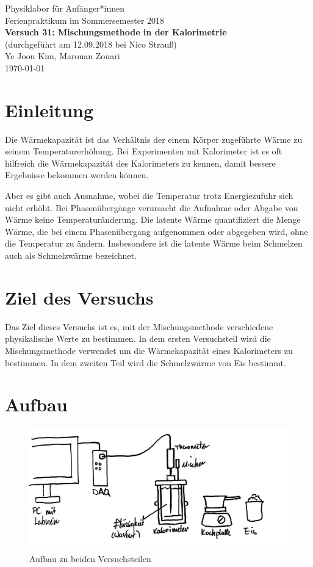 \documentclass[11pt,a4paper]{article} %
\begin{document}
	

{
	\centering 
	\large 
	Physiklabor für Anfänger*innen \\
	Ferienpraktikum im Sommersemester 2018 \\[4mm]
	\textbf{\LARGE 
		Versuch 31: Mischungsmethode in der Kalorimetrie
	} \\[3mm]
	(durchgeführt am 12.09.2018 bei Nico Strauß) \\
	Ye Joon Kim, Marouan Zouari\\
	\today \\[10mm]
}

\section{Einleitung}
Die Wärmekapazität ist das Verhältnis der einem Körper zugeführte Wärme zu seinem Temperaturerhöhung. Bei Experimenten mit Kalorimeter ist es oft hilfreich die Wärmekapazität des Kalorimeters zu kennen, damit bessere Ergebnisse bekommen werden können. 

Aber es gibt auch Ausnahme, wobei die Temperatur trotz Energiezufuhr sich nicht erhöht. Bei Phasenübergänge verursacht die Aufnahme oder Abgabe von Wärme keine Temperaturänderung. Die latente Wärme quantifiziert die Menge Wärme, die bei einem Phasenübergang aufgenommen oder abgegeben wird, ohne die Temperatur zu ändern. Insbesondere ist die latente Wärme beim Schmelzen auch als Schmelzwärme bezeichnet. 


\section{Ziel des Versuchs}
Das Ziel dieses Versuchs ist es, mit der Mischungsmethode verschiedene physikalische Werte zu bestimmen. In dem ersten Versuchsteil wird die Mischungsmethode verwendet um die Wärmekapazität eines Kalorimeters zu bestimmen. In dem zweiten Teil wird die Schmelzwärme von Eis bestimmt. 

\section{Aufbau}
\begin{figure}
	\centering
	\includegraphics[width=\linewidth]{Abb3}
	\caption{Aufbau zu beiden Versuchsteilen}
\end{figure}
\end{document}
